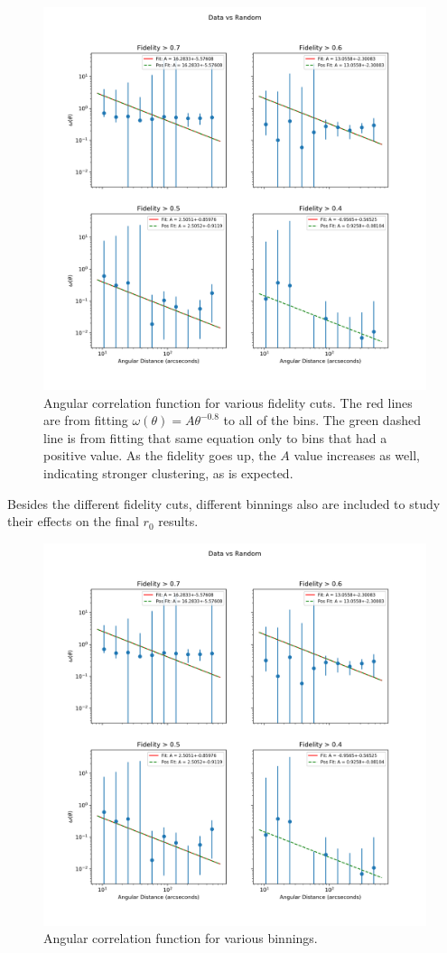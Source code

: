 \begin{figure}[tbp]
\centering \includegraphics[width=120mm]{Fidelity/Log_4Panel_Data_Vs_Random_bin10_NFalse_Num10000.png}
\caption{Angular correlation function for various fidelity cuts. The red lines are from fitting $\omega(\theta) = A\theta^{-0.8} $ to all of the bins. The green dashed line is from fitting that same equation only to bins that had a positive value. As the fidelity goes up, the $A$ value increases as well, indicating stronger clustering, as is expected.}
\label{fig:Angular_correlation}
\end{figure}

Besides the different fidelity cuts, different binnings also are included to study their effects on the final $r_0$ results. 

\begin{figure}[tbp]
\centering \includegraphics[width=120mm]{Fidelity/Log_4Panel_Data_Vs_Random_bin10_NFalse_Num10000.png}
\caption{Angular correlation function for various binnings.}
\label{fig:Angular_binnings}
\end{figure}

